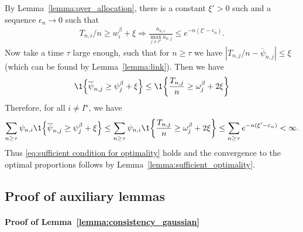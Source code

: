 By Lemma~\ref{lemma:over_allocation}, there is a constant $\xi' > 0$ such and a sequence $\epsilon_n \rightarrow 0$ such that
	\begin{align*}
	T_{n, i} / n \geq w_{i}^\beta + \xi \Rightarrow \frac{a_{n,i}}{\max_{j \neq I^\star} a_{n,j}} \leq e^{-n(\xi' - \epsilon_n)}.
	\end{align*}
Now take a time $\tau$ large enough, such that for $n \geq \tau$ we have $| T_{n,j} / n - \overline{\psi}_{n,j} | \leq \xi$ (which can be found by Lemma~\ref{lemma:link}). Then we have
	\begin{align*}
	    \1{\left\lbrace \overline{\psi}_{n,j} \geq \psi_j^{\beta} + \xi \right\rbrace } \leq \1{\left\lbrace \frac{T_{n,j}}{n} \geq \omega_j^\beta + 2\xi \right\rbrace }
	\end{align*}
Therefore, for all $i \neq I^\star$, we have
	\begin{align*}
	    \sum_{n \geq \tau} \psi_{n, i} 	\1{\left\lbrace \overline{\psi}_{n,j} \geq \psi_j^{\beta} + \xi \right\rbrace }
	    \leq \sum_{n \geq \tau} \psi_{n, i} \1{\left\lbrace \frac{T_{n,j}}{n} \geq \omega_j^\beta + 2\xi \right\rbrace }
	    \leq \sum_{n \geq \tau} e^{-n(\xi' - \epsilon_n)} < \infty.
	\end{align*}
Thus \eqref{eq:sufficient condition for optimality} holds and the convergence to the optimal proportions follows by Lemma~\ref{lemma:sufficient_optimality}.

\subsection{Proof of auxiliary lemmas}\label{app:posterior_gaussian.aux}

\paragraph{Proof of Lemma~\ref{lemma:consistency_gaussian}}
	
